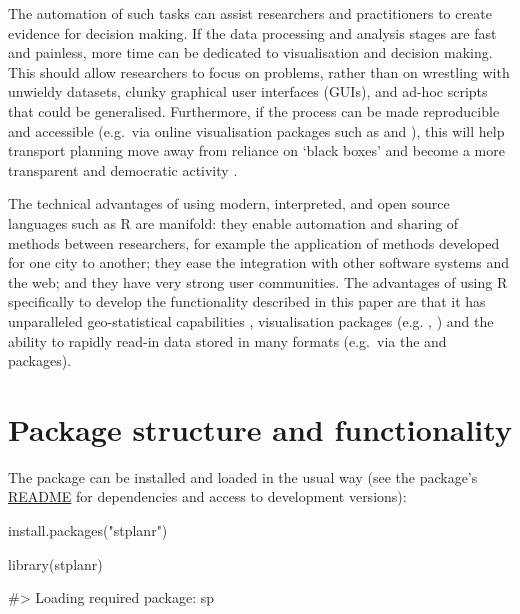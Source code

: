 The automation of such tasks can assist researchers and practitioners to
create evidence for decision making. If the data processing and analysis
stages are fast and painless, more time can be dedicated to
visualisation and decision making. This should allow researchers to
focus on problems, rather than on wrestling with unwieldy datasets,
clunky graphical user interfaces (GUIs), and ad-hoc scripts that could
be generalised. Furthermore, if the process can be made reproducible and
accessible (e.g.~via online visualisation packages such as
 and ), this will help transport
planning move away from reliance on `black boxes' and become a more
transparent and democratic activity
\citep{waddell_urbansim:_2002,hollander_who_2015}.

The technical advantages of using modern, interpreted, and open source
languages such as R are manifold: they enable automation and sharing of
methods between researchers, for example the application of methods
developed for one city to another; they ease the integration with other
software systems and the web; and they have very strong user
communities. The advantages of using R specifically to develop the
functionality described in this paper are that it has unparalleled
geo-statistical capabilities \citep{pebesma_software_2015},
visualisation packages (e.g. , ) and the
ability to rapidly read-in data stored in many formats (e.g.~via the
 and  packages).

\section{Package structure and
functionality}\label{package-structure-and-functionality}

The package can be installed and loaded in the usual way (see the
package's \href{https://github.com/ropensci/stplanr}{README} for
dependencies and access to development versions):

\begin{Schunk}
\begin{Sinput}
install.packages("stplanr")
\end{Sinput}
\end{Schunk}

\begin{Schunk}
\begin{Sinput}
library(stplanr)
\end{Sinput}
\begin{Soutput}
#> Loading required package: sp
\end{Soutput}
\end{Schunk}

